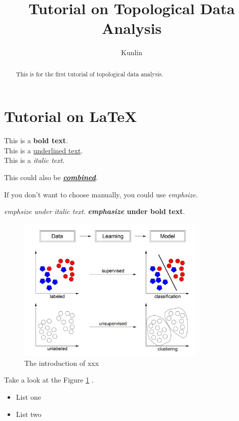 \documentclass[12pt,a4paper]{article}
\begin{document}
\title{Tutorial on Topological Data Analysis}
\author{Kunlin}
\maketitle

\tableofcontents

\begin{abstract}
    This is for the first tutorial of topological data analysis. 
\end{abstract}

\section{Tutorial on \LaTeX}

This is a \textbf{bold text}. \\
This is a \underline{underlined text}. \\
This is a \textit{italic text}. 

This could  also be \underline{\textbf{\textit{combined}}}.

If you don't want to choose manually, you could use \emph{emphsize}. 

\textit{\emph{emphsize} under italic text}. 
\textbf{\emph{emphasize} under bold text}. 

\begin{figure}[h]
    \centering
    \includegraphics[width=0.8\textwidth]{img/ml.png}
    \caption{The introduction of xxx}
    \label{fig:ml}
\end{figure}

Take a look at the Figure \ref{fig:ml} . 

\begin{itemize}
    \item List one
    \item List two
\end{itemize}
\end{document}
